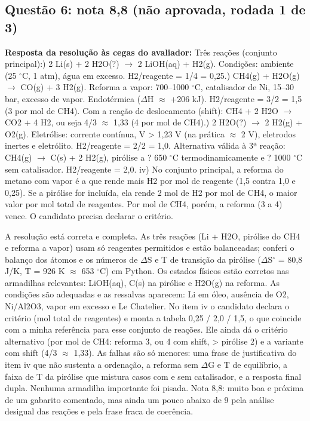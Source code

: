 \documentclass{article}%
\begin{document}
\subsection*{Questão 6: nota 8,8 (não aprovada, rodada 1 de 3)}%
\textbf{Resposta da resolução às cegas do avaliador:} Três reações (conjunto principal):) 2 Li(s) + 2 H2O(?) $\to$ 2 LiOH(aq) + H2(g). Condições: ambiente (25 $^\circ$C, 1 atm), água em excesso. H2/reagente = 1/4 = 0,25.) CH4(g) + H2O(g) $\to$ CO(g) + 3 H2(g). Reforma a vapor: 700--1000 $^\circ$C, catalisador de Ni, 15--30 bar, excesso de vapor. Endotérmica ($\Delta$H $\approx$ +206 kJ). H2/reagente = 3/2 = 1,5 (3 por mol de CH4). Com a reação de deslocamento (shift): CH4 + 2 H2O $\to$ CO2 + 4 H2, ou seja 4/3 $\approx$ 1,33 (4 por mol de CH4).) 2 H2O(?) $\to$ 2 H2(g) + O2(g). Eletrólise: corrente contínua, V > 1,23 V (na prática $\approx$ 2 V), eletrodos inertes e eletrólito. H2/reagente = 2/2 = 1,0.\newline%
Alternativa válida à 3ª reação: CH4(g) $\to$ C(s) + 2 H2(g), pirólise a ? 650 $^\circ$C termodinamicamente e ? 1000 $^\circ$C sem catalisador. H2/reagente = 2,0.\newline%
iv) No conjunto principal, a reforma do metano com vapor é a que rende mais H2 por mol de reagente (1,5 contra 1,0 e 0,25). Se a pirólise for incluída, ela rende 2 mol de H2 por mol de CH4, o maior valor por mol total de reagentes. Por mol de CH4, porém, a reforma (3 a 4) vence. O candidato precisa declarar o critério.\par %
A resolução está correta e completa. As três reações (Li + H2O, pirólise do CH4 e reforma a vapor) usam só reagentes permitidos e estão balanceadas; conferi o balanço dos átomos e os números de $\Delta$S e T de transição da pirólise ($\Delta$S$^\circ$ = 80,8 J/K, T = 926 K $\approx$ 653 $^\circ$C) em Python. Os estados físicos estão corretos nas armadilhas relevantes: LiOH(aq), C(s) na pirólise e H2O(g) na reforma. As condições são adequadas e as ressalvas aparecem: Li em óleo, ausência de O2, Ni/Al2O3, vapor em excesso e Le Chatelier. No item iv o candidato declara o critério (mol total de reagentes) e monta a tabela 0,25 / 2,0 / 1,5, o que coincide com a minha referência para esse conjunto de reações. Ele ainda dá o critério alternativo (por mol de CH4: reforma 3, ou 4 com shift, > pirólise 2) e a variante com shift (4/3 $\approx$ 1,33). As falhas são só menores: uma frase de justificativa do item iv que não sustenta a ordenação, a reforma sem $\Delta$G e T de equilíbrio, a faixa de T da pirólise que mistura casos com e sem catalisador, e a resposta final dupla. Nenhuma armadilha importante foi pisada. Nota 8,8: muito boa e próxima de um gabarito comentado, mas ainda um pouco abaixo de 9 pela análise desigual das reações e pela frase fraca de coerência.%
\end{document}
